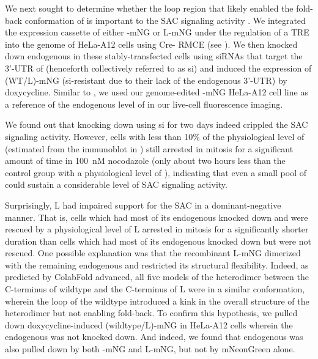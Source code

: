 We next sought to determine whether the loop region that likely enabled the fold-back conformation of  is important to the SAC signaling activity . We integrated the expression cassette of either -mNG or \textDelta{}L-mNG under the regulation of a TRE into the genome of HeLa-A12 cells using Cre- RMCE (see ). We then knocked down endogenous  in these stably-transfected cells using siRNAs that target the 3'-UTR of  \cite{siMAD1-3UTR} (henceforth collectively referred to as si) and induced the expression of (WT/\textDelta{}L)-mNG (si-resistant due to their lack of the endogenous 3'-UTR) by doxycycline. Similar to , we used our genome-edited -mNG HeLa-A12 cell line as a reference of the endogenous level of  in our live-cell fluorescence imaging.

We found out that knocking down  using si for two days indeed crippled the SAC signaling activity. However, cells with less than 10\% of the physiological level of  (estimated from the immunoblot in ) still arrested in mitosis for a significant amount of time in \SI{100}{nM} nocodazole (only about two hours less than the control group with a physiological level of ), indicating that even a small pool of  could sustain a considerable level of SAC signaling activity.


Surprisingly, \textDelta{}L had impaired support for the SAC in a dominant-negative manner. That is, cells which had most of its endogenous  knocked down and were rescued by a physiological level of \textDelta{}L arrested in mitosis for a significantly shorter duration than cells which had most of its endogenous  knocked down but were not rescued. One possible explanation was that the recombinant \textDelta{}L-mNG dimerized with the remaining endogenous  and restricted its structural flexibility. Indeed, as predicted by ColabFold advanced, all five models of the heterodimer between the C-terminus of wildtype  and the C-terminus of \textDelta{}L were in a similar conformation, wherein the loop of the wildtype  introduced a kink in the overall structure of the heterodimer but not enabling fold-back. To confirm this hypothesis, we pulled down doxycycline-induced (wildtype/\textDelta{}L)-mNG in HeLa-A12 cells wherein the endogenous  was not knocked down. And indeed, we found that endogenous  was also pulled down by both -mNG and \textDelta{}L-mNG, but not by mNeonGreen alone.

